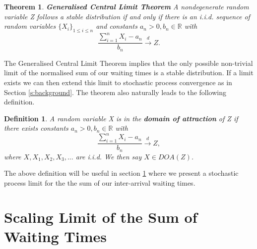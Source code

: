 \documentclass[honours,12pt,twoside, openright]{unswthesis}
\newcommand{\R}{\mathbb{R}}
\newcommand{\1}{\mathbf 1}
\newtheorem{theorem}[equation]{Theorem}
\newtheorem{definition}[equation]{Definition}
\numberwithin{equation}{section}
\theoremstyle{definition}
\theoremstyle{remark}
\begin{document}
\begin{theorem}\cite{Nolan2015}\label{th:gclt}
\textbf{Generalised Central Limit Theorem} A nondegenerate random variable Z follows a stable distribution if and only if there is an i.i.d. sequence of random variables $\{X_i\}_{1\leq i \leq n}$  and constants $a_n>0, b_n \in \R$ with 
\[
	\frac{\sum^n_{i=1}X_i-a_n}{b_n} \overset{d}{\longrightarrow}Z.
\]
\end{theorem}

\noindent The Generalised Central Limit Theorem implies that the only possible non-trivial limit of the normalised sum of our waiting times is a stable distribution. If a limit exists we can then extend this limit to stochastic process convergence as in Section \ref{s:background}. The theorem also naturally leads to the following definition.\\

\begin{definition}\cite{Nolan2015}\label{def:DOA}
	A random variable X is in the \textbf{domain of attraction} of Z if there exists constants $a_n>0,b_n\in\R$ with
	\[
		\frac{\sum^n_{i=1}X_i-a_n}{b_n} \overset{d}{\longrightarrow}Z,
	\]
	where $X, X_1, X_2, X_3, \ldots$ are i.i.d. We then say $X\in DOA(Z)$.\\
\end{definition}

\noindent The above definition will be useful in section \ref{s:waitingTimes} where we present a stochastic process limit for the the sum of our inter-arrival waiting times.\\

\section{Scaling Limit of the Sum of Waiting Times}\label{s:waitingTimes}
\end{document}
